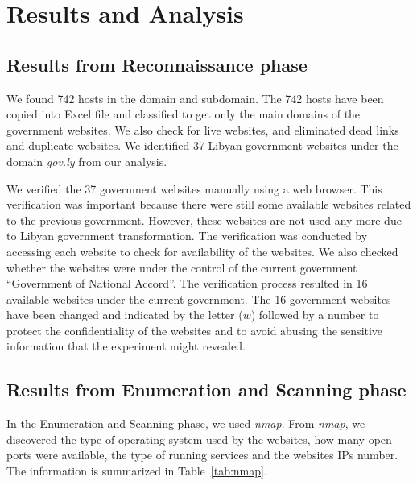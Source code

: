 \documentclass[conference,letterpaper]{IEEEtran}
\begin{document}
\section{Results and Analysis}


\subsection{Results from Reconnaissance phase}


We found 742 hosts in the domain and subdomain. The 742 hosts have
been copied into Excel file and classified to get only the main
domains of the government websites. We also check for live websites,
and eliminated dead links and duplicate websites. We identified 37
Libyan government websites under the domain \emph{gov.ly} from our
analysis.

We verified the 37 government websites manually using a web
browser. This verification was important because there were still some
available websites related to the previous government. However, these
websites are not used any more due to Libyan government
transformation.  The verification was conducted by accessing each
website to check for availability of the websites. We also checked
whether the websites were under the control of the current government
``Government of National Accord''. The verification process resulted
in 16 available websites under the current government. The 16
government websites have been changed and indicated by the letter
($w$) followed by a number to protect the confidentiality of the
websites and to avoid abusing the sensitive information that the
experiment might revealed.

\subsection{Results from Enumeration and Scanning phase}


In the Enumeration and Scanning phase, we used \emph{nmap}. From
\emph{nmap}, we discovered the type of operating system used by the
websites, how many open ports were available, the type of running
services and the websites IPs number. The information is summarized in
Table~\ref{tab:nmap}.
\end{document}
